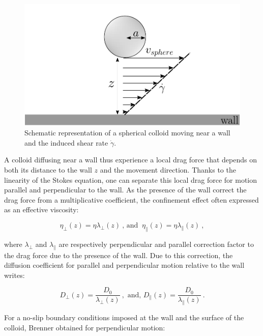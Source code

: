 \begin{figure}[ht]
	\centering
	\includegraphics{02_body/chapter3/images/draw_shear/shear.pdf}
	\caption{Schematic representation of a spherical colloid moving near a wall and the induced shear rate $\dot{\gamma}$.} 
	\label{fig.shear}
\end{figure}

A colloid diffusing near a wall thus experience a local drag force that depends on both its distance to the wall $z$ and the movement direction. Thanks to the linearity of the Stokes equation, one can separate this local drag force for motion parallel and perpendicular to the wall. As the presence of the wall correct the drag force from a multiplicative coefficient, the confinement effect often expressed as an effective viscosity:

\begin{equation}
	\eta _\bot (z) = {\eta}{\lambda _ \bot (z)}  ~ \text{, and } ~\eta _\parallel (z) =  {\eta}{\lambda _ \parallel (z)}~,
\end{equation}

where $\lambda _\bot$ and $\lambda _\parallel$ are respectively perpendicular and parallel correction factor to the drag force due to the presence of the wall. Due to this correction, the diffusion coefficient for parallel and perpendicular motion relative to the wall writes:

\begin{equation}
	D_\bot (z) =  \frac{D_0}{\lambda _\bot (z)}  ~, \text{ and, } D_\parallel (z) = \frac{D_0}{ \lambda_\parallel (z)} ~.
\end{equation}

For a no-slip boundary conditions imposed at the wall and the surface of the colloid, Brenner \cite{brenner_slow_1961} obtained for perpendicular motion:



